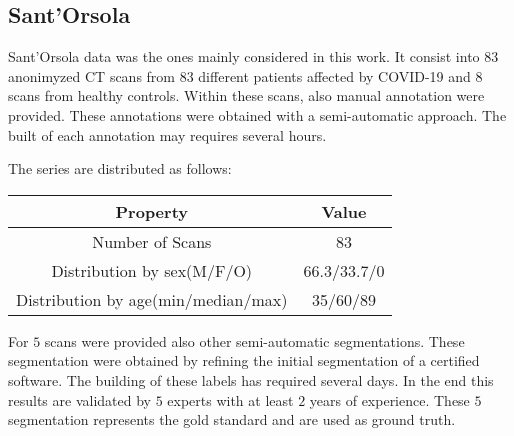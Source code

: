 \documentclass{standalone}
\begin{document}
	\subsection{Sant'Orsola}
	
	Sant'Orsola data was the ones mainly considered in this work. It consist into 83 anonimyzed CT scans from $83$ different patients affected by COVID-19 and $8$ scans from healthy controls. 
	Within these scans, also manual annotation were provided. These annotations were obtained with a semi-automatic approach. The built of each annotation may requires several hours.
	
		The series are distributed as follows: 
	\begin{table}[h!]
		\centering
		\begin{tabular}{|c|c|}
			\hline
			\textbf{Property}   		&	\textbf{Value} \\ \hline
			Number of Scans 			& 83			   \\ 
			Distribution by sex(M/F/O)  		& 66.3/33.7/0    \\
			Distribution by age(min/median/max) & 35/60/89	\\ \hline
		\end{tabular}
	\end{table}
	
	
	For $5$ scans were provided also other semi-automatic segmentations. These segmentation were obtained by refining the initial segmentation of a certified software. The building of these labels has required several days. In the end this results are validated by $5$ experts with at least $2$ years of experience. These $5$ segmentation represents the gold standard and are used as ground truth.
	
\end{document}
